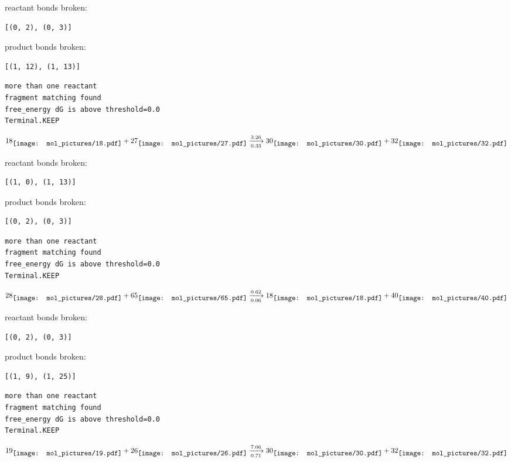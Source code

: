 \documentclass{article}
\begin{document}
reactant bonds broken:\begin{verbatim}
[(0, 2), (0, 3)]
\end{verbatim}
product bonds broken:\begin{verbatim}
[(1, 12), (1, 13)]
\end{verbatim}




\vspace{1cm}
\begin{verbatim}
more than one reactant
fragment matching found
free_energy dG is above threshold=0.0
Terminal.KEEP
\end{verbatim}
$$
18
\raisebox{-.5\height}{\texttt{[image: mol\_pictures/18.pdf]}}
+
27
\raisebox{-.5\height}{\texttt{[image: mol\_pictures/27.pdf]}}
\xrightarrow[0.33]{3.26}
30
\raisebox{-.5\height}{\texttt{[image: mol\_pictures/30.pdf]}}
+
32
\raisebox{-.5\height}{\texttt{[image: mol\_pictures/32.pdf]}}
$$


reactant bonds broken:\begin{verbatim}
[(1, 0), (1, 13)]
\end{verbatim}
product bonds broken:\begin{verbatim}
[(0, 2), (0, 3)]
\end{verbatim}




\vspace{1cm}
\begin{verbatim}
more than one reactant
fragment matching found
free_energy dG is above threshold=0.0
Terminal.KEEP
\end{verbatim}
$$
28
\raisebox{-.5\height}{\texttt{[image: mol\_pictures/28.pdf]}}
+
65
\raisebox{-.5\height}{\texttt{[image: mol\_pictures/65.pdf]}}
\xrightarrow[0.06]{0.62}
18
\raisebox{-.5\height}{\texttt{[image: mol\_pictures/18.pdf]}}
+
40
\raisebox{-.5\height}{\texttt{[image: mol\_pictures/40.pdf]}}
$$


reactant bonds broken:\begin{verbatim}
[(0, 2), (0, 3)]
\end{verbatim}
product bonds broken:\begin{verbatim}
[(1, 9), (1, 25)]
\end{verbatim}




\vspace{1cm}
\begin{verbatim}
more than one reactant
fragment matching found
free_energy dG is above threshold=0.0
Terminal.KEEP
\end{verbatim}
$$
19
\raisebox{-.5\height}{\texttt{[image: mol\_pictures/19.pdf]}}
+
26
\raisebox{-.5\height}{\texttt{[image: mol\_pictures/26.pdf]}}
\xrightarrow[0.71]{7.06}
30
\raisebox{-.5\height}{\texttt{[image: mol\_pictures/30.pdf]}}
+
32
\raisebox{-.5\height}{\texttt{[image: mol\_pictures/32.pdf]}}
$$
\end{document}

